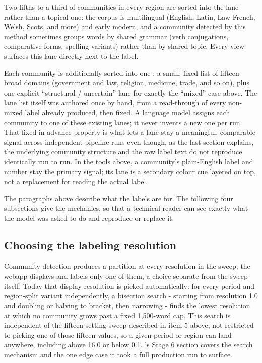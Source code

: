 \documentclass[11pt]{article}
\begin{document}
Two-fifths to a
third of communities in every region are sorted into the
 lane rather than a
topical one: the corpus is multilingual (English, Latin, Law French,
Welsh, Scots, and more) and early modern, and a community detected by
this method sometimes groups words by shared grammar (verb
conjugations, comparative forms, spelling variants) rather than by
shared topic. Every view surfaces this lane directly next to the label.

Each community is additionally sorted into one : a small,
fixed list of fifteen broad domains (government and law, religion,
medicine, trade, and so on), plus one explicit ``structural / uncertain''
lane for exactly the ``mixed'' case above. The lane list itself was
authored once by hand, from a read-through of every non-mixed label
already produced, then fixed. A language model assigns each community
to one of these existing lanes; it never invents a new one per run. That
fixed-in-advance property is what lets a lane stay a meaningful,
comparable signal across independent pipeline runs even though, as the
last section explains, the underlying community structure and the raw
label text do not reproduce identically run to run. In the tools above,
a community's plain-English label and number stay the primary signal;
its lane is a secondary colour cue layered on top, not a replacement for
reading the actual label.

The paragraphs above describe what the labels are for. The following
four subsections give the mechanics, so that a technical reader can
see exactly what the model was asked to do and reproduce or replace
it.

\subsection{Choosing the labeling resolution}

Community detection produces a partition at every resolution in the
sweep; the webapp displays and labels only one of them, a choice
separate from the sweep itself. Today that display resolution is
picked automatically: for every period and region-split variant
independently, a bisection search - starting from resolution 1.0 and
doubling or halving to bracket, then narrowing - finds the lowest
resolution at which no community grows past a fixed 1{,}500-word cap.
This search is independent of the fifteen-setting sweep described in
item 5 above, not restricted to picking one of those fifteen values,
so a given period or region can land anywhere, including above 16.0 or
below 0.1. 's Stage 6 section covers
the search mechanism and the one edge case it took a full production
run to surface.
\end{document}
